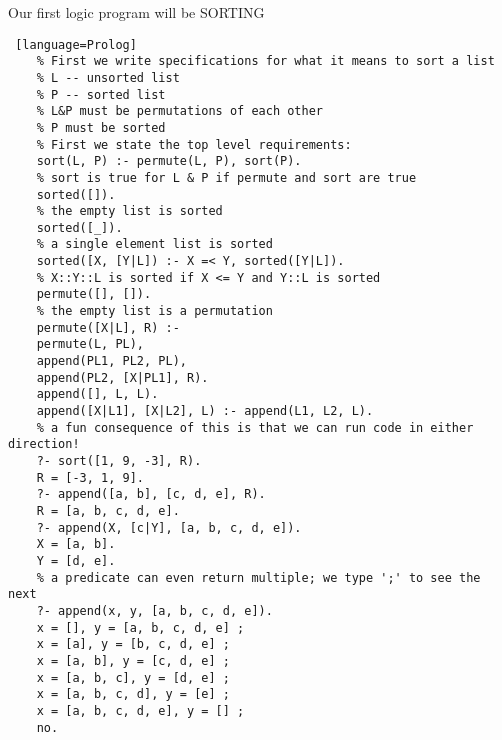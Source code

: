 \documentclass[../../lecture_notes.tex]{subfiles}
\begin{document}
Our first logic program will be SORTING
\begin{lstlisting} [language=Prolog]
	% First we write specifications for what it means to sort a list
	% L -- unsorted list
	% P -- sorted list
 	% L&P must be permutations of each other
 	% P must be sorted
 	% First we state the top level requirements:
 	sort(L, P) :- permute(L, P), sort(P).
 	% sort is true for L & P if permute and sort are true
 	sorted([]).
 	% the empty list is sorted
 	sorted([_]).
 	% a single element list is sorted
 	sorted([X, [Y|L]) :- X =< Y, sorted([Y|L]).
 	% X::Y::L is sorted if X <= Y and Y::L is sorted
 	permute([], []).
 	% the empty list is a permutation
 	permute([X|L], R) :-
 	permute(L, PL),
 	append(PL1, PL2, PL),
 	append(PL2, [X|PL1], R).
 	append([], L, L).
 	append([X|L1], [X|L2], L) :- append(L1, L2, L).
 	% a fun consequence of this is that we can run code in either direction!
 	?- sort([1, 9, -3], R).
 	R = [-3, 1, 9].
 	?- append([a, b], [c, d, e], R).
 	R = [a, b, c, d, e].
 	?- append(X, [c|Y], [a, b, c, d, e]).
 	X = [a, b].	
 	Y = [d, e].
 	% a predicate can even return multiple; we type ';' to see the next
 	?- append(x, y, [a, b, c, d, e]).
 	x = [], y = [a, b, c, d, e] ;
 	x = [a], y = [b, c, d, e] ;
 	x = [a, b], y = [c, d, e] ;
 	x = [a, b, c], y = [d, e] ;
 	x = [a, b, c, d], y = [e] ;
 	x = [a, b, c, d, e], y = [] ;
 	no.
\end{lstlisting}
\end{document}
